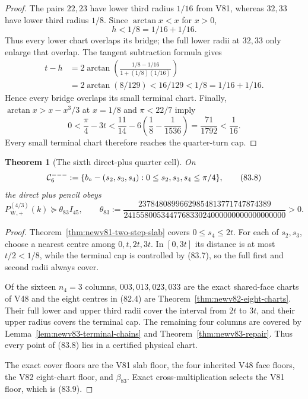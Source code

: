 \documentclass[11pt,oneside]{article}
\newtheorem{theorem}{Theorem}[section]
\theoremstyle{definition}
\theoremstyle{remark}
\begin{document}
\begin{proof}
The pairs \(22,23\) have lower third radius \(1/16\) from V81,
whereas \(32,33\) have lower third radius \(1/8\).  Since
\(\arctan x<x\) for \(x>0\),
\[
 h<1/8=1/16+1/16.                                    \tag{83.5}
\]
Thus every lower chart overlaps its bridge; the full lower radii
at \(32,33\) only enlarge that overlap.  The tangent subtraction
formula gives
\[
\begin{split}
 t-h
 &=2\arctan\!\left(
 \frac{1/8-1/16}{1+(1/8)(1/16)}\right)\\
 &=2\arctan(8/129)<16/129<1/8
   =1/16+1/16.
\end{split}                                            \tag{83.6}
\]
Hence every bridge overlaps its small terminal chart.
Finally, \(\arctan x>x-x^3/3\) at \(x=1/8\) and \(\pi<22/7\)
imply
\[
 0<\frac{\pi}{4}-3t
 <\frac{11}{14}-6\left(\frac18-\frac1{1536}\right)
 =\frac{71}{1792}<\frac1{16}.                         \tag{83.7}
\]
Every small terminal chart therefore reaches the quarter-turn cap.
\end{proof}

\begin{theorem}[The sixth direct-plus quarter cell]
\label{thm:newv83-sixth-cell}
On
\[
 {\cal C}^{---}_6:=
 \{b_\circ-(s_2,s_3,s_4):
      0\leq s_2,s_3,s_4\leq\pi/4\},                   \tag{83.8}
\]
the direct plus pencil obeys
\[
 P_{\mathrm W,+}^{(4/3)}(k)
 \succeq\theta_{83}I_{45},\qquad
 \theta_{83}:=
 \frac{23784808996629854813771747874389}
 {241558005344776833024000000000000000000}>0.         \tag{83.9}
\]
\end{theorem}

\begin{proof}
Theorem~\ref{thm:newv81-two-step-slab} covers
\(0\leq s_4\leq2t\).  For each of \(s_2,s_3\), choose a nearest
centre among \(0,t,2t,3t\).  In \([0,3t]\) its distance is at most
\(t/2<1/8\), while the terminal cap is controlled by (83.7), so
the full first and second radii always cover.

Of the sixteen \(n_4=3\) columns, \(003,013,023,033\) are the exact
shared-face charts of V48 and the eight centres in (82.4) are
Theorem~\ref{thm:newv82-eight-charts}.  Their full lower and upper
third radii cover the interval from \(2t\) to \(3t\), and their
upper radius covers the terminal cap.  The remaining four columns
are covered by Lemma~\ref{lem:newv83-terminal-chains} and
Theorem~\ref{thm:newv83-repair}.  Thus every point of (83.8) lies
in a certified physical chart.

The exact cover floors are the V81 slab floor, the four inherited
V48 face floors, the V82 eight-chart floor, and \(\beta_{83}\).
Exact cross-multiplication selects the V81 floor, which is (83.9).
\end{proof}
\end{document}
